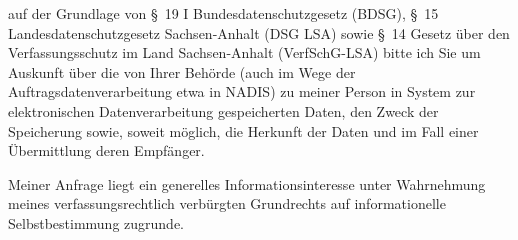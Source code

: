 auf der Grundlage von §~19 I Bundesdatenschutzgesetz (BDSG),
§~15 Landesdatenschutzgesetz Sachsen-Anhalt (DSG LSA) sowie
§~14 Gesetz über den Verfassungsschutz im Land Sachsen-Anhalt (VerfSchG-LSA)
bitte ich Sie um Auskunft über die von Ihrer Behörde (auch im Wege der Auftragsdatenverarbeitung
etwa in NADIS) zu meiner Person in System zur elektronischen Datenverarbeitung
gespeicherten Daten, den Zweck der Speicherung sowie, soweit möglich, die Herkunft
der Daten und im Fall einer Übermittlung deren Empfänger.

Meiner Anfrage liegt ein generelles Informationsinteresse unter Wahrnehmung
meines verfassungsrechtlich verbürgten Grundrechts auf informationelle
Selbstbestimmung zugrunde.
